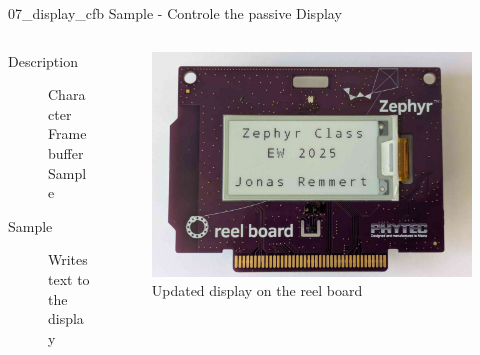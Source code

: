 \documentclass[10pt, aspectratio=169]{beamer}
\begin{document}
\begin{frame}[fragile]{07\_display\_cfb Sample - Controle the passive Display}
  \begin{columns}
    \begin{column}{0.6\textwidth}
      \begin{description}
        \item [Description] Character Framebuffer Sample \footnotemark
        \item [Sample] Writes text to the display
      \end{description}
    \end{column}
    \begin{column}{0.4\textwidth}
      \begin{figure}
        \includegraphics[width=\textwidth]{images/reel_board_passive_display.jpg}
        \caption*{Updated display on the reel board}
      \end{figure}
    \end{column}
  \end{columns}
\end{frame}
\end{document}
